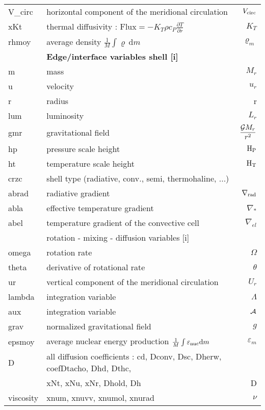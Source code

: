 \documentclass[10pt]{article}
\begin{document}
\begin{center}
\begin{tabular}[@{\renewcommand{\baselinestretch}{5}}]{|l| lr|}
V\_circ & horizontal component of the meridional circulation & $V_{\rm circ}$ \\
xKt & thermal diffusivity : $\mathrm{Flux} = -K_T \rho c_P \displaystyle \frac{\partial 
  T}{\partial r} $ & $K_T$  \\
rhmoy & average density $\frac{1}{M} \int \varrho\, \mathrm{d} m$ &
$\varrho_m$  \\\hline 
\hline
 & {\bf \sf Edge/interface  variables shell [i]}  &  \\ \hline\hline
 m & mass  & $M_r$ \\
 u & velocity  & $u_r$ \\
 r & radius  & r \\
 lum & luminosity  & $L_r$\\
 gmr & gravitational field & $\displaystyle \frac{{\cal G} M_r}{r^2}$  \\
 hp & pressure scale height & $\rm H_P$ \\
 ht & temperature scale height & $\rm H_T$ \\
 crzc & shell type (radiative, conv., semi, thermohaline, ...) &  \\
 abrad & radiative gradient & $\nabla_{\rm rad}$  \\ 
 abla & effective temperature gradient & $\nabla_*$  \\
 abel & temperature gradient of the convective cell & $\nabla_{el}$  \\ \hline
 & {\sf rotation - mixing - diffusion variables [i]}  & \\ \hline
 omega & rotation rate  & $\Omega$ \\
 theta & derivative of rotational rate  & $\theta$ \\
 ur & vertical component of the meridional circulation  & $U_r$ \\
 lambda & integration variable   & $\Lambda$ \\
 aux & integration variable  & $\cal{A}$    \\ 
 grav & normalized gravitational field & $g$ \\
epsmoy & average nuclear energy production $\frac{1}{M} \int
\varepsilon_{\rm nuc} \mathrm{d} m$ & $\varepsilon_m$ \\ 
D & all diffusion coefficients : cd, Dconv, Dsc, Dherw, coefDtacho,
    Dhd, Dthc, & \\
 & xNt, xNu, xNr, Dhold, Dh  & D \\ 
viscosity & xnum, xnuvv, xnumol, xnurad & $\nu$ \\ \hline 
\end{tabular}

\end{center}
\printindex 
\end{document}
